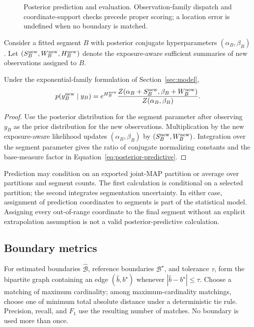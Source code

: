 \begin{figure}[t]
  \centering
  \resizebox{0.96\columnwidth}{!}{}
  \caption{Posterior prediction and evaluation. Observation-family dispatch and coordinate-support checks precede proper scoring; a location error is undefined when no boundary is matched.}
  \label{fig:posterior-prediction-paper}
\end{figure}

Consider a fitted segment $B$ with posterior conjugate hyperparameters $(\alpha_B,\beta_B)$. Let $(S_B^{\rm new},W_B^{\rm new},H_B^{\rm new})$ denote the exposure-aware sufficient summaries of new observations assigned to $B$.

\begin{proposition}
\label{prop:predictive-paper}
Under the exponential-family formulation of Section~\ref{sec:model},
\begin{equation}
 p(y_B^{\rm new}\mid y_B)
 =e^{H_B^{\rm new}}
 \frac{Z(\alpha_B+S_B^{\rm new},\beta_B+W_B^{\rm new})}
      {Z(\alpha_B,\beta_B)}.
\label{eq:posterior-predictive}
\end{equation}
\end{proposition}
\begin{proof}
Use the posterior distribution for the segment parameter after observing $y_B$ as the prior distribution for the new observations. Multiplication by the new exposure-aware likelihood updates $(\alpha_B,\beta_B)$ by $(S_B^{\rm new},W_B^{\rm new})$. Integration over the segment parameter gives the ratio of conjugate normalizing constants and the base-measure factor in Equation~\eqref{eq:posterior-predictive}.
\end{proof}

Prediction may condition on an exported joint-MAP partition or average over partitions and segment counts. The first calculation is conditional on a selected partition; the second integrates segmentation uncertainty. In either case, assignment of prediction coordinates to segments is part of the statistical model. Assigning every out-of-range coordinate to the final segment without an explicit extrapolation assumption is not a valid posterior-predictive calculation.

\subsection{Boundary metrics}
\begin{definition}
\label{def:boundary-matching-paper}
For estimated boundaries $\widehat{\mathcal B}$, reference boundaries $\mathcal B^\star$, and tolerance $\tau$, form the bipartite graph containing an edge $(\widehat b,b^\star)$ whenever $|\widehat b-b^\star|\le\tau$. Choose a matching of maximum cardinality; among maximum-cardinality matchings, choose one of minimum total absolute distance under a deterministic tie rule. Precision, recall, and $F_1$ use the resulting number of matches. No boundary is used more than once.
\end{definition}

